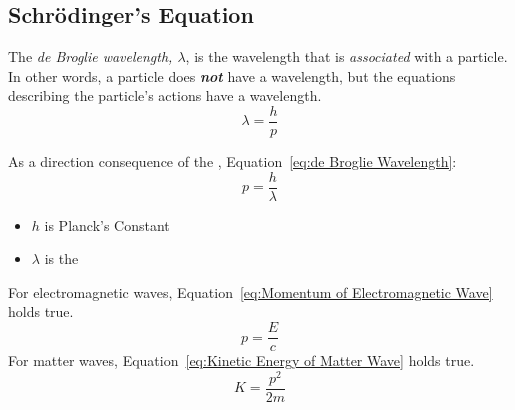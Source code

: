 	\subsection{Schr\"{o}dinger's Equation} \label{subsec:Schrodingers Equation}
		\begin{definition} \label{def:de Broglie Wavelength}
			The \emph{de Broglie wavelength, $\lambda$}, is the wavelength that is \emph{associated} with a particle.
			In other words, a particle does \emph{\textbf{not}} have a wavelength, but the equations describing the particle's actions have a wavelength.
			\begin{equation} \label{eq:de Broglie Wavelength}
				\lambda = \frac{h}{p}
			\end{equation}
			\begin{note} \label{note:de Broglie Wavelength Momentum}
				As a direction consequence of the , Equation~\eqref{eq:de Broglie Wavelength}:
				\begin{equation}
					p = \frac{h}{\lambda}
				\end{equation}
				\begin{itemize}[noitemsep, nolistsep]
					\item $h$ is Planck's Constant
					\item $\lambda$ is the 
				\end{itemize}
			For electromagnetic waves, Equation~\eqref{eq:Momentum of Electromagnetic Wave} holds true.
				\begin{equation} \label{eq:Momentum of Electromagnetic Wave}
					p = \frac{E}{c}
				\end{equation}
			For matter waves, Equation~\eqref{eq:Kinetic Energy of Matter Wave} holds true.
				\begin{equation} \label{eq:Kinetic Energy of Matter Wave}
					K = \frac{p^{2}}{2m}
				\end{equation}
			\end{note}
		\end{definition}
